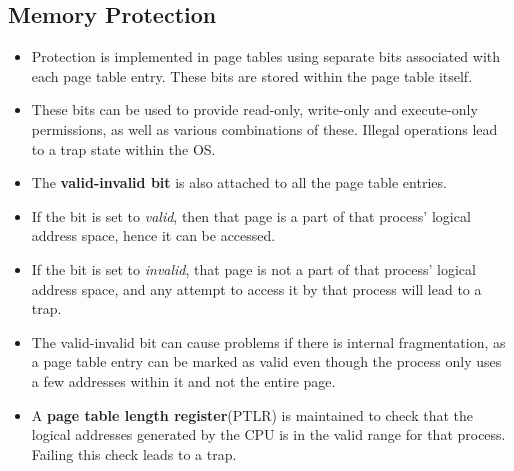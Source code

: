 \documentclass{article}
\theoremstyle{plain}
\theoremstyle{definition}
\begin{document}
\subsection{Memory Protection}
\begin{itemize}
    \item Protection is implemented in page tables using separate bits associated with each page table entry. These bits are stored within the page table itself.
    
    \item These bits can be used to provide read-only, write-only and execute-only permissions, as well as various combinations of these. Illegal operations lead to a trap state within the OS.
    
    \item The \textbf{valid-invalid bit} is also attached to all the page table entries.  
    
    \item If the bit is set to \textit{valid}, then that page is a part of that process' logical address space, hence it can be accessed.
    
    \item If the bit is set to \textit{invalid}, that page is not a part of that process' logical address space, and any attempt to access it by that process will lead to a trap.
    
    \item The valid-invalid bit can cause problems if there is internal fragmentation, as a page table entry can be marked as valid even though the process only uses a few addresses within it and not the entire page. 
    
    \item A \textbf{page table length register}(PTLR) is maintained to check that the logical addresses generated by the CPU is in the valid range for that process. Failing this check leads to a trap. 
\end{itemize}
\end{document}
